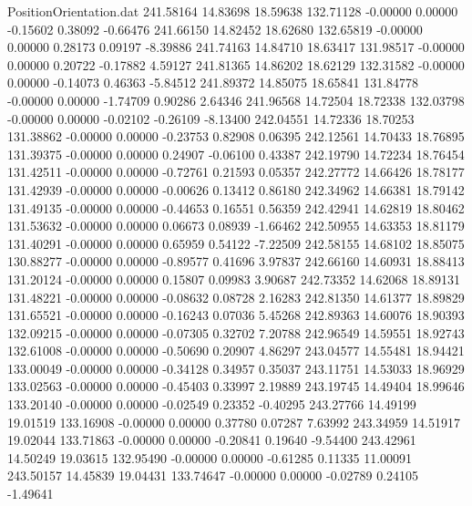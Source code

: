 \begin{filecontents}{PositionOrientation.dat}
 241.58164   14.83698   18.59638   132.71128   -0.00000    0.00000   -0.15602    0.38092   -0.66476
 241.66150   14.82452   18.62680   132.65819   -0.00000    0.00000    0.28173    0.09197   -8.39886
 241.74163   14.84710   18.63417   131.98517   -0.00000    0.00000    0.20722   -0.17882    4.59127
 241.81365   14.86202   18.62129   132.31582   -0.00000    0.00000   -0.14073    0.46363   -5.84512
 241.89372   14.85075   18.65841   131.84778   -0.00000    0.00000   -1.74709    0.90286    2.64346
 241.96568   14.72504   18.72338   132.03798   -0.00000    0.00000   -0.02102   -0.26109   -8.13400
 242.04551   14.72336   18.70253   131.38862   -0.00000    0.00000   -0.23753    0.82908    0.06395
 242.12561   14.70433   18.76895   131.39375   -0.00000    0.00000    0.24907   -0.06100    0.43387
 242.19790   14.72234   18.76454   131.42511   -0.00000    0.00000   -0.72761    0.21593    0.05357
 242.27772   14.66426   18.78177   131.42939   -0.00000    0.00000   -0.00626    0.13412    0.86180
 242.34962   14.66381   18.79142   131.49135   -0.00000    0.00000   -0.44653    0.16551    0.56359
 242.42941   14.62819   18.80462   131.53632   -0.00000    0.00000    0.06673    0.08939   -1.66462
 242.50955   14.63353   18.81179   131.40291   -0.00000    0.00000    0.65959    0.54122   -7.22509
 242.58155   14.68102   18.85075   130.88277   -0.00000    0.00000   -0.89577    0.41696    3.97837
 242.66160   14.60931   18.88413   131.20124   -0.00000    0.00000    0.15807    0.09983    3.90687
 242.73352   14.62068   18.89131   131.48221   -0.00000    0.00000   -0.08632    0.08728    2.16283
 242.81350   14.61377   18.89829   131.65521   -0.00000    0.00000   -0.16243    0.07036    5.45268
 242.89363   14.60076   18.90393   132.09215   -0.00000    0.00000   -0.07305    0.32702    7.20788
 242.96549   14.59551   18.92743   132.61008   -0.00000    0.00000   -0.50690    0.20907    4.86297
 243.04577   14.55481   18.94421   133.00049   -0.00000    0.00000   -0.34128    0.34957    0.35037
 243.11751   14.53033   18.96929   133.02563   -0.00000    0.00000   -0.45403    0.33997    2.19889
 243.19745   14.49404   18.99646   133.20140   -0.00000    0.00000   -0.02549    0.23352   -0.40295
 243.27766   14.49199   19.01519   133.16908   -0.00000    0.00000    0.37780    0.07287    7.63992
 243.34959   14.51917   19.02044   133.71863   -0.00000    0.00000   -0.20841    0.19640   -9.54400
 243.42961   14.50249   19.03615   132.95490   -0.00000    0.00000   -0.61285    0.11335   11.00091
 243.50157   14.45839   19.04431   133.74647   -0.00000    0.00000   -0.02789    0.24105   -1.49641

\end{filecontents}
